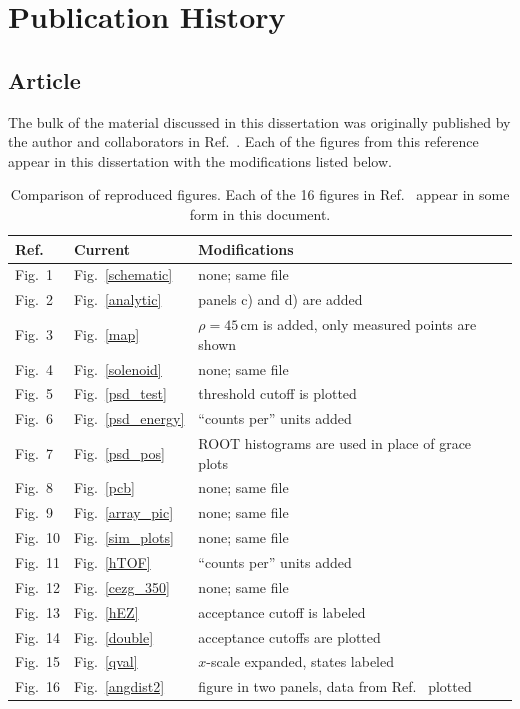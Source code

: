 \chapter{Publication History}
\section{Article}
\label{fig_notes}
The bulk of the material discussed in this dissertation was originally published by the author and collaborators in Ref.~\cite{Lighthall_2010}.  Each of the figures from this reference appear in this dissertation with the modifications listed below.


\renewcommand{\arraystretch}{1.3} %
\begin{table}[ht]%
  \centering
  \begin{tabular}{lll}
    \hline
    Ref.~\cite{Lighthall_2010}&Current&Modifications\\
    \hline \hline
    Fig.~1&Fig.~\ref{schematic}&none; same file\\
    Fig.~2&Fig.~\ref{analytic}&panels c) and d) are added\\
    Fig.~3&Fig.~\ref{map}&$\rho=45$\,cm is added, only measured points are shown\\
    Fig.~4&Fig.~\ref{solenoid}&none; same file\\
    Fig.~5&Fig.~\ref{psd_test}&threshold cutoff is plotted\\
    Fig.~6&Fig.~\ref{psd_energy}&``counts per'' units added\\
    Fig.~7&Fig.~\ref{psd_pos}&ROOT histograms are used in place of grace plots\\
    Fig.~8&Fig.~\ref{pcb}&none; same file\\
    Fig.~9&Fig.~\ref{array_pic}&none; same file\\
    Fig.~10&Fig.~\ref{sim_plots}&none; same file\\
    Fig.~11&Fig.~\ref{hTOF}&``counts per'' units added\\
    Fig.~12&Fig.~\ref{cezg_350}&none; same file\\
    Fig.~13&Fig.~\ref{hEZ}&acceptance cutoff is labeled\\
    Fig.~14&Fig.~\ref{double}&acceptance cutoffs are plotted\\
    Fig.~15&Fig.~\ref{qval}&$x$-scale expanded, states labeled\\
    Fig.~16&Fig.~\ref{angdist2}&figure in two panels, data from Ref.~\cite{Mermaz_1971} plotted\\
    \hline
  \end{tabular}
  \caption[Comparison of reproduced figures.]{Comparison of reproduced figures.  Each of the 16 figures in Ref.~\cite{Lighthall_2010} appear in some form in this document.}
  \label{fig_corr}
\end{table}

